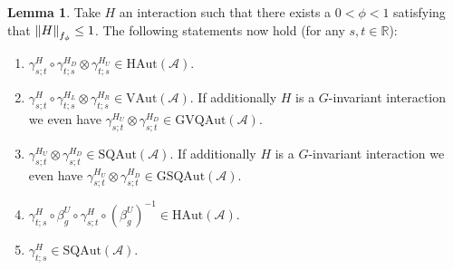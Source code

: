 \documentclass[12pt,a4paper,twoside]{article}
\renewcommand{\AA}{\mathcal A}
\newcommand{\RR}{\mathbb R}
\theoremstyle{definition}
\newtheorem{lemma}[theorem]{Lemma}
\numberwithin{equation}{section}
\begin{document}
\begin{lemma}\label{lem:PropertiesLocallyGeneratedAutomorphisms}
	Take $H$ an interaction such that there exists a $0<\phi<1$ satisfying that $\norm{H}_{f_\phi}\leq 1$. The following statements now hold (for any $s,t\in\RR$):
	\begin{enumerate}
		\item $\gamma^H_{s;t}\circ\gamma^{H_D}_{t;s}\otimes\gamma^{H_U}_{t;s}\in\textrm{HAut}(\AA)$.
		\item $\gamma^H_{s;t}\circ\gamma^{H_L}_{t;s}\otimes\gamma^{H_R}_{t;s}\in\textrm{VAut}(\AA)$. If additionally $H$ is a $G$-invariant interaction we even have $\gamma^{H_U}_{s;t}\otimes\gamma^{H_D}_{s;t}\in\textrm{GVQAut}(\AA)$.
		\item $\gamma^{H_U}_{s;t}\otimes\gamma^{H_D}_{s;t}\in\textrm{SQAut}(\AA)$. If additionally $H$ is a $G$-invariant interaction we even have $\gamma^{H_U}_{s;t}\otimes\gamma^{H_D}_{s;t}\in\textrm{GSQAut}(\AA)$.
		\item $\gamma^{H}_{t;s}\circ\beta_g^U\circ\gamma^{H}_{s;t}\circ(\beta_g^U)^{-1}\in\textrm{HAut}(\AA)$.
		\item $\gamma^{H}_{t;s}\in\textrm{SQAut}(\AA)$.
	\end{enumerate}
\end{lemma}
\end{document}
